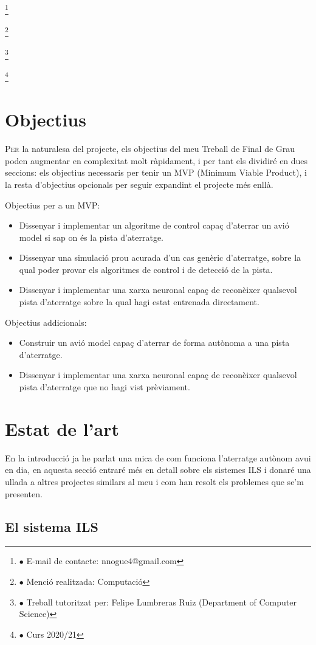 \documentclass[10pt,a4paper,twocolumn,twoside]{article}
\newcommand\blfootnote[1]{%
  \begingroup
  \renewcommand\thefootnote{}\footnote{#1}%
  \addtocounter{footnote}{-1}%
  \endgroup
}
\begin{document}
\blfootnote{$\bullet$ E-mail de contacte: nnogue4@gmail.com}
\blfootnote{$\bullet$ Menció realitzada: Computació}
\blfootnote{$\bullet$ Treball tutoritzat per: Felipe Lumbreras Ruiz (Department of Computer Science)}
\blfootnote{$\bullet$ Curs 2020/21}

\section{Objectius}

\lettrine[lines=3]{P}{er} la naturalesa del projecte, els objectius del meu Treball de Final de Grau poden
augmentar en complexitat molt ràpidament, i per tant els dividiré en dues seccions: els objectius necessaris per tenir un
MVP (Minimum Viable Product), i la resta d'objectius opcionals per seguir expandint el projecte més enllà.

Objectius per a un MVP:
\begin{itemize}
  \item Dissenyar i implementar un algoritme de control capaç d'aterrar un avió model si sap on és la pista d'aterratge.
  \item Dissenyar una simulació prou acurada d'un cas genèric d'aterratge, sobre la qual poder provar els algoritmes de control i de detecció de la pista.
  \item Dissenyar i implementar una xarxa neuronal capaç de reconèixer qualsevol pista d'aterratge sobre la qual hagi estat entrenada directament.
\end{itemize}
Objectius addicionals:
\begin{itemize}
\item Construir un avió model capaç d'aterrar de forma autònoma a una pista d'aterratge.
\item Dissenyar i implementar una xarxa neuronal capaç de reconèixer qualsevol pista d'aterratge que no hagi vist prèviament.
\end{itemize}

\section{Estat de l'art}

En la introducció ja he parlat una mica de com funciona l'aterratge autònom avui en dia, en aquesta secció entraré més en detall
sobre els sistemes ILS i donaré una ullada a altres projectes similars al meu i com han resolt els problemes que se'm presenten.

\subsection{El sistema ILS}
\label{subsec-ils-system}
\end{document}
